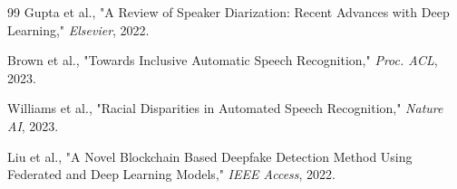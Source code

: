 \documentclass[conference]{IEEEtran}
\begin{document}
\begin{thebibliography}{99}
Gupta et al., "A Review of Speaker Diarization: Recent Advances with Deep Learning," \textit{Elsevier}, 2022.

Brown et al., "Towards Inclusive Automatic Speech Recognition," \textit{Proc. ACL}, 2023.

Williams et al., "Racial Disparities in Automated Speech Recognition," \textit{Nature AI}, 2023.

Liu et al., "A Novel Blockchain Based Deepfake Detection Method Using Federated and Deep Learning Models," \textit{IEEE Access}, 2022.

\end{thebibliography}
\end{document}
